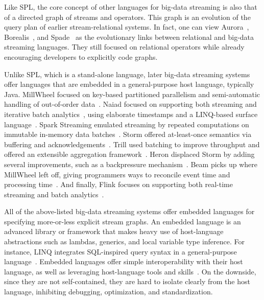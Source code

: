 \vspace*{-0.3mm}
Like SPL, the core concept of other languages for big-data streaming
is also that of a directed graph of streams and operators. This graph
is an evolution of the query plan of earlier stream-relational
systems. In fact, one can view \textsf{Aurora}~\cite{abadi_et_al_2003},
\textsf{Borealis}~\cite{abadi_et_al_2005}, and
\textsf{Spade}~\cite{gedik_et_al_2008} as the evolutionary links
between relational and big-data streaming languages. They still focused
on relational operators while already encouraging developers to
explicitly code graphs.

\vspace*{-0.3mm}
Unlike SPL, which is a stand-alone language, later big-data streaming
systems offer languages that are embedded in a general-purpose host
language, typically Java. \textsf{MillWheel} focused on key-based
partitioned parallelism and semi-automatic handling of out-of-order
data~\cite{akidau_et_al_2013}. \textsf{Naiad} focused on supporting
both streaming and iterative batch analytics~\cite{murray_et_al_2013},
using elaborate timestamps and a LINQ-based surface
language~\cite{meijer_beckman_bierman_2006}.  \textsf{Spark Streaming}
emulated streaming by repeated computations on immutable in-me\-mo\-ry
data batches~\cite{zaharia_et_al_2013}. \textsf{Storm} offered
at-least-once semantics via buffering and
acknowledgements~\cite{toshniwal_et_al_2014}.  \textsf{Trill} used
batching to improve throughput and offered an extensible
aggregation framework~\cite{chandramouli_et_al_2014}.  \textsf{Heron}
displaced Storm by adding several improvements, such as a backpressure
mechanism~\cite{kulkarni_et_al_2015}. \textsf{Beam} picks up where
MillWheel left off, giving programmers ways to reconcile event time
and processing time~\cite{akidau_et_al_2015}. And finally,
\textsf{Flink} focuses on supporting both real-time streaming and batch
analytics~\cite{carbone_et_al_2015}.

\vspace*{-0.3mm}
All of the above-listed big-data streaming systems offer embedded
languages for specifying more-or-less explicit stream graphs. An
embedded language is an advanced library or framework that makes heavy
use of host-language abstractions such as lambdas, generics, and local
variable type inference. For instance, LINQ integrates SQL-inspired
query syntax in a general-purpose
language~\cite{meijer_beckman_bierman_2006}.  Embedded languages
offer simple interoperability with their host language, as well
as leveraging host-language tools and skills~\cite{hudak_1998}. On the
downside, since they are not self-contained, they are hard to isolate
clearly from the host language, inhibiting debugging, optimization,
and standardization.
